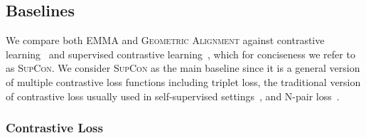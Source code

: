 \documentclass[10pt]{article} %
\newcommand{\ours}{\textsc{EMMA}}
\newcommand{\geom}{\textsc{Geometric Alignment}}
\newcommand{\supcon}{\textsc{SupCon}}
\begin{document}
\subsection{Baselines}
We compare both \ours{} and \geom{} against contrastive learning~\citep{chen2020simple} and supervised contrastive learning~\citep{NEURIPS2020_supervised_contrastive}, which for conciseness we refer to as \supcon{}.
We consider \supcon{} as the main baseline since it is a general version of multiple contrastive loss functions including triplet loss, the traditional version of contrastive loss usually used in self-supervised settings~\citep{chen2020simple}, and N-pair loss~\citep{NIPS2016N-PairLoss}.

\subsubsection{Contrastive Loss}
\label{sub:baseline-contrastive}
\end{document}
